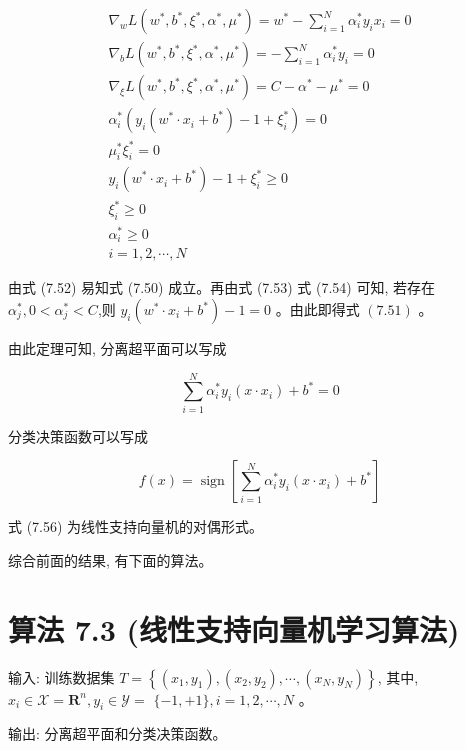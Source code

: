 \documentclass[10pt]{article}
\begin{document}
\begin{gather*}
\nabla_{w} L\left(w^{*}, b^{*}, \xi^{*}, \alpha^{*}, \mu^{*}\right)=w^{*}-\sum_{i=1}^{N} \alpha_{i}^{*} y_{i} x_{i}=0  \tag{7.52}\\
\nabla_{b} L\left(w^{*}, b^{*}, \xi^{*}, \alpha^{*}, \mu^{*}\right)=-\sum_{i=1}^{N} \alpha_{i}^{*} y_{i}=0 \\
\nabla_{\xi} L\left(w^{*}, b^{*}, \xi^{*}, \alpha^{*}, \mu^{*}\right)=C-\alpha^{*}-\mu^{*}=0 \\
\alpha_{i}^{*}\left(y_{i}\left(w^{*} \cdot x_{i}+b^{*}\right)-1+\xi_{i}^{*}\right)=0  \tag{7.53}\\
\mu_{i}^{*} \xi_{i}^{*}=0  \tag{7.54}\\
y_{i}\left(w^{*} \cdot x_{i}+b^{*}\right)-1+\xi_{i}^{*} \geqslant 0 \\
\xi_{i}^{*} \geqslant 0 \\
\alpha_{i}^{*} \geqslant 0 \\
i=1,2, \cdots, N
\end{gather*}


由式 (7.52) 易知式 (7.50) 成立。再由式 (7.53) 式 (7.54) 可知, 若存在 $\alpha_{j}^{*}, 0<\alpha_{j}^{*}<C$,则 $y_{i}\left(w^{*} \cdot x_{i}+b^{*}\right)-1=0$ 。由此即得式 $(7.51)$ 。

由此定理可知, 分离超平面可以写成


\begin{equation*}
\sum_{i=1}^{N} \alpha_{i}^{*} y_{i}\left(x \cdot x_{i}\right)+b^{*}=0 \tag{7.55}
\end{equation*}


分类决策函数可以写成


\begin{equation*}
f(x)=\operatorname{sign}\left[\sum_{i=1}^{N} \alpha_{i}^{*} y_{i}\left(x \cdot x_{i}\right)+b^{*}\right] \tag{7.56}
\end{equation*}


式 (7.56) 为线性支持向量机的对偶形式。

综合前面的结果, 有下面的算法。

\section*{算法 7.3 (线性支持向量机学习算法)}
输入: 训练数据集 $T=\left\{\left(x_{1}, y_{1}\right),\left(x_{2}, y_{2}\right), \cdots,\left(x_{N}, y_{N}\right)\right\}$, 其中, $x_{i} \in \mathcal{X}=\boldsymbol{R}^{n}, y_{i} \in \mathcal{Y}=$ $\{-1,+1\}, i=1,2, \cdots, N$ 。

输出: 分离超平面和分类决策函数。
\end{document}
